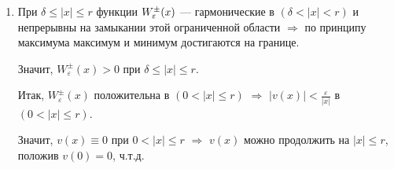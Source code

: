 \begin{enumerate}
\item{

При $\delta \le |x| \le r$  функции $W_\varepsilon^{\pm}(x)$
 --- гармонические в $(\delta < |x| < r)$ и непрерывны на замыкании 
этой ограниченной области $\Rightarrow$ по принципу максимума 
максимум и минимум достигаются на границе.

Значит, $W_\varepsilon^{\pm} (x) > 0$ при $\delta \le |x| \le r$.

Итак, $W_\varepsilon^\pm(x)$ положительна в $(0<|x| \le r)$
$\Rightarrow$  $|v(x)| < \frac{\varepsilon}{|x|}$ в $(0<|x|\le r)$.

Значит, $v(x) \equiv 0$ при $0<|x|\le r$ $\Rightarrow$ $v(x)$ можно продолжить на $|x|\le r$, положив $v(0)=0$, ч.т.д. 

}

\end{enumerate}


